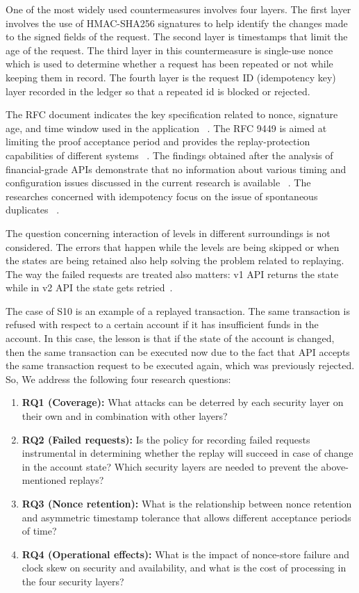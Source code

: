 \documentclass[conference]{IEEEtran}
\begin{document}
One of the most widely used countermeasures involves four layers. The first layer involves the use of HMAC-SHA256 signatures to help identify the changes made to the signed fields of the request. The second layer is timestamps that limit the age of the request. The third layer in this countermeasure is single-use nonce which is used to determine whether a request has been repeated or not while keeping them in record. The fourth layer is the request ID (idempotency key) layer recorded in the ledger so that a repeated id is blocked or rejected.

The RFC document indicates the key specification related to nonce, signature age, and time window used in the application ~\cite{rfc9421}. The RFC 9449 is aimed at limiting the proof acceptance period and provides the replay-protection capabilities of different systems ~\cite{rfc9449}. The findings obtained after the analysis of financial-grade APIs demonstrate that no information about various timing and configuration issues discussed in the current research is available ~\cite{fett19,hosseyni24}. The researches concerned with idempotency focus on the issue of spontaneous duplicates ~\cite{lee15,whitaker25}.

The question concerning interaction of levels in different surroundings is not considered. The errors that happen while the levels are being skipped or when the states are being retained also help solving the problem related to replaying. The way the failed requests are treated also matters: v1 API returns the state while in v2 API the state gets retried~\cite{stripe}.

The case of S10 is an example of a replayed transaction. The same transaction is refused with respect to a certain account if it has insufficient funds in the account. In this case, the lesson is that if the state of the account is changed, then the same transaction can be executed now due to the fact that API accepts the same transaction request to be executed again, which was previously rejected. So, We address the following four research questions:

\begin{enumerate}
\item \textbf{RQ1 (Coverage):} What attacks can be deterred by each security layer on their own and in combination with other layers?

\item \textbf{RQ2 (Failed requests):} Is the policy for recording failed requests instrumental in determining whether the replay will succeed in case of change in the account state? Which security layers are needed to prevent the above-mentioned replays? 

\item \textbf{RQ3 (Nonce retention):} What is the relationship between nonce retention and asymmetric timestamp tolerance that allows different acceptance periods of time? 

\item \textbf{RQ4 (Operational effects):} What is the impact of nonce-store failure and clock skew on security and availability, and what is the cost of processing in the four security layers?

\end{enumerate}
\end{document}
